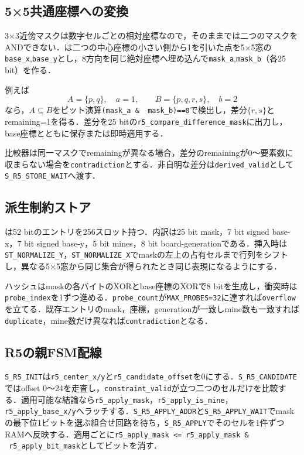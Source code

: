 \subsection{5×5共通座標への変換}

3×3近傍マスクは数字セルごとの相対座標なので，そのままでは二つのマスクをANDできない．は二つの中心座標の小さい側から1を引いた点を5×5窓の\texttt{base\_x},\texttt{base\_y}とし，8方向を同じ絶対座標へ埋め込んで\texttt{mask\_a},\texttt{mask\_b}（各25 bit）を作る．

例えば
\begin{equation}
  A=\{p,q\},\quad a=1,\qquad B=\{p,q,r,s\},\quad b=2
\end{equation}
なら，$A\subseteq B$をビット演算\texttt{(mask\_a \& ~mask\_b)==0}で検出し，差分$\{r,s\}$とremaining=1を得る．差分を25 bitの\texttt{r5\_compare\_difference\_mask}に出力し，base座標とともに保存または即時適用する．

比較器は同一マスクでremainingが異なる場合，差分のremainingが0〜要素数に収まらない場合を\texttt{contradiction}とする．非自明な差分は\texttt{derived\_valid}として\texttt{S\_R5\_STORE\_WAIT}へ渡す．

\subsection{派生制約ストア}

は52 bitのエントリを256スロット持つ．内訳は25 bit mask，7 bit signed base-x，7 bit signed base-y，5 bit mines，8 bit board-generationである．挿入時は\texttt{ST\_NORMALIZE\_Y}，\texttt{ST\_NORMALIZE\_X}でmaskの左上の占有セルまで行列をシフトし，異なる5×5窓から同じ集合が得られたとき同じ表現になるようにする．

ハッシュはmaskの各バイトのXORとbase座標のXORで8 bitを生成し，衝突時は\texttt{probe\_index}を1ずつ進める．\texttt{probe\_count}が\texttt{MAX\_PROBES=32}に達すれば\texttt{overflow}を立てる．既存エントリのmask，座標，generationが一致しmine数も一致すれば\texttt{duplicate}，mine数だけ異なれば\texttt{contradiction}となる．

\subsection{R5の親FSM配線}

\texttt{S\_R5\_INIT}は\texttt{r5\_center\_x/y}と\texttt{r5\_candidate\_offset}を0にする．\texttt{S\_R5\_CANDIDATE}ではoffset 0〜24を走査し，\texttt{constraint\_valid}が立つ二つのセルだけを比較する．適用可能な結論なら\texttt{r5\_apply\_mask}，\texttt{r5\_apply\_is\_mine}，\texttt{r5\_apply\_base\_x/y}へラッチする．\texttt{S\_R5\_APPLY\_ADDR}と\texttt{S\_R5\_APPLY\_WAIT}でmaskの最下位1ビットを選ぶ組合せ回路を待ち，\texttt{S\_R5\_APPLY}でそのセルを1件ずつRAMへ反映する．適用ごとに\texttt{r5\_apply\_mask <= r5\_apply\_mask \& ~r5\_apply\_bit\_mask}としてビットを消す．

